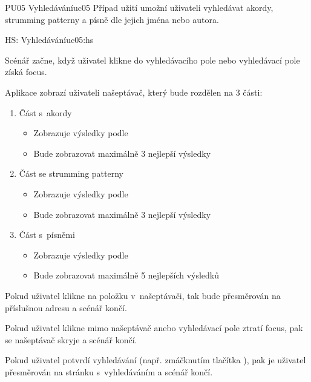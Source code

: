 \begin{usecase}{PU05 Vyhledávání}{uc05}
    Případ užití umožní uživateli vyhledávat akordy, strumming patterny a písně dle jejich jména nebo autora.

    \begin{scenario}{HS: Vyhledávání}{uc05:hs}
        \item Scénář začne, když uživatel klikne do vyhledávacího pole nebo vyhledávací pole získá focus.
        \item Aplikace zobrazí uživateli našeptávač, který bude rozdělen na 3 části:
        \begin{enumerate}
            \item Část s~akordy
                  \begin{itemize}
                      \item Zobrazuje výsledky podle~
                      \item Bude zobrazovat maximálně 3 nejlepší výsledky
                  \end{itemize}
            \item Část se strumming patterny
                  \begin{itemize}
                      \item Zobrazuje výsledky podle~
                      \item Bude zobrazovat maximálně 3 nejlepší výsledky
                  \end{itemize}
            \item Část s~písněmi
                  \begin{itemize}
                      \item Zobrazuje výsledky podle~
                      \item Bude zobrazovat maximálně 5 nejlepších výsledků
                  \end{itemize}
        \end{enumerate}
        \item Pokud uživatel klikne na položku v~našeptávači, tak bude přesměrován na příslušnou adresu a scénář končí.
        \item Pokud uživatel klikne mimo našeptávač anebo vyhledávací pole ztratí focus, pak se našeptávač skryje a scénář končí.
        \item Pokud uživatel potvrdí vyhledávání (např. zmáčknutím tlačítka ), pak je uživatel přesměrován na stránku s~vyhledáváním a scénář končí.
    \end{scenario}


\end{usecase}
